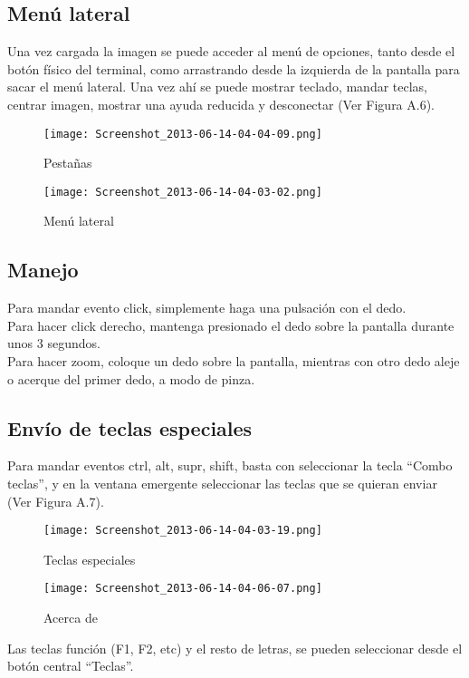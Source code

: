 \subsection{Menú lateral}
Una vez cargada la imagen se puede acceder al menú de opciones, tanto desde el botón físico del terminal, como arrastrando desde la izquierda de la pantalla para sacar el menú lateral. Una vez ahí se puede mostrar teclado, mandar teclas, centrar imagen, mostrar una ayuda reducida  y desconectar (Ver Figura A.6).
\begin{figure}[h]
\hfill
\begin{minipage}[t]{.45\textwidth}
\begin{center}
\texttt{[image: Screenshot\_2013-06-14-04-04-09.png]}
\caption{Pestañas}
\end{center}
\end{minipage}
\hfill
\begin{minipage}[t]{.45\textwidth}
\begin{center}
\texttt{[image: Screenshot\_2013-06-14-04-03-02.png]}
\caption{Menú lateral}
\end{center}
\end{minipage}
\hfill
\end{figure}
\subsection{Manejo}
Para mandar evento click, simplemente haga una pulsación con el dedo.\\

Para hacer click derecho, mantenga presionado el dedo sobre la pantalla durante unos 3 segundos.\\

Para hacer zoom, coloque un dedo sobre la pantalla, mientras con otro dedo aleje o acerque del primer dedo, a modo de pinza.
\subsection{Envío de teclas especiales}
Para mandar eventos ctrl, alt, supr, shift, basta con seleccionar la tecla ``Combo teclas'', y en la ventana emergente seleccionar las teclas que se quieran enviar (Ver Figura A.7).
\begin{figure}[h]
\hfill
\begin{minipage}[t]{.45\textwidth}
\begin{center}
\texttt{[image: Screenshot\_2013-06-14-04-03-19.png]}
\caption{Teclas especiales}
\end{center}
\end{minipage}
\hfill
\begin{minipage}[t]{.45\textwidth}
\begin{center}
\texttt{[image: Screenshot\_2013-06-14-04-06-07.png]}
\caption{Acerca de}
\end{center}
\end{minipage}
\hfill
\end{figure}

Las teclas función (F1, F2, etc) y el resto de letras, se pueden seleccionar desde el botón central ``Teclas''.
